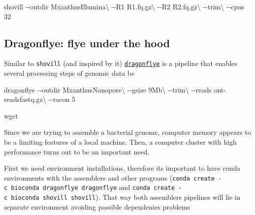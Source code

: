 \documentclass[
  letterpaper,
]{scrbook}
\newenvironment{Shaded}{\begin{snugshade}}{\end{snugshade}}
\newcommand{\AttributeTok}[1]{\textcolor[rgb]{0.40,0.46,0.14}{#1}}
\newcommand{\DataTypeTok}[1]{\textcolor[rgb]{0.68,0.00,0.00}{#1}}
\newcommand{\ExtensionTok}[1]{\textcolor[rgb]{0.00,0.46,0.62}{#1}}
\newcommand{\FunctionTok}[1]{\textcolor[rgb]{0.28,0.35,0.67}{#1}}
\newcommand{\NormalTok}[1]{\textcolor[rgb]{0.00,0.46,0.62}{#1}}
\begin{document}
\begin{Shaded}
\begin{Highlighting}[]
\ExtensionTok{shovill} \AttributeTok{{-}{-}outdir}\NormalTok{ MxanthusIllumina}\DataTypeTok{\textbackslash{}}
        \AttributeTok{{-}{-}R1}\NormalTok{ R1.fq.gz}\DataTypeTok{\textbackslash{}}
        \AttributeTok{{-}{-}R2}\NormalTok{ R2.fq.gz}\DataTypeTok{\textbackslash{}}
        \AttributeTok{{-}{-}trim}\DataTypeTok{\textbackslash{}}
        \AttributeTok{{-}{-}cpus}\NormalTok{ 32}
\end{Highlighting}
\end{Shaded}

\hypertarget{dragonflye-flye-under-the-hood}{%
\subsection*{Dragonflye: flye under the
hood}\label{dragonflye-flye-under-the-hood}}

Similar to \texttt{shovill} (and inspired by it)
\href{}{\texttt{dragonflye}} is a pipeline that enables several
processing steps of genomic data be

\begin{Shaded}
\begin{Highlighting}[]
\ExtensionTok{dragonflye} \AttributeTok{{-}{-}outdir}\NormalTok{ MxanthusNanopore}\DataTypeTok{\textbackslash{}}
           \AttributeTok{{-}{-}gsize}\NormalTok{ 9Mb}\DataTypeTok{\textbackslash{}}
           \AttributeTok{{-}{-}trim}\DataTypeTok{\textbackslash{}}
           \AttributeTok{{-}{-}reads}\NormalTok{ ont{-}readsfastq.gz}\DataTypeTok{\textbackslash{}}
           \AttributeTok{{-}{-}racon}\NormalTok{ 5}
\end{Highlighting}
\end{Shaded}

\begin{Shaded}
\begin{Highlighting}[]
\FunctionTok{wget}
\end{Highlighting}
\end{Shaded}

Since we are trying to assemble a bacterial genome, computer memory
appears to be a limiting features of a local machine. Then, a computer
cluster with high performance turns out to be an important need.

First we need environment installations, therefore its important to have
conda environments with the assemblers and other programs
(\texttt{conda\ create\ -c\ bioconda\ dragonflye\ dragonflye} and
\texttt{conda\ create\ -c\ bioconda\ shovill\ shovill}). That way both
assemblers pipelines will lie in separate environment avoiding possible
dependenies problems
\end{document}

